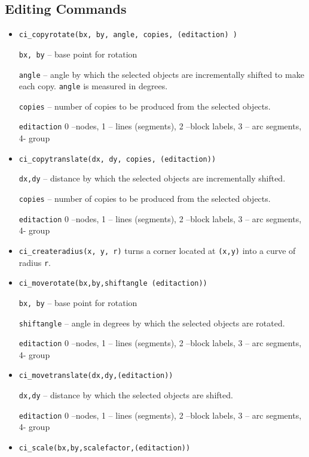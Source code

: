 \subsection{Editing Commands}
\begin{itemize}

\item \texttt{ci\_copyrotate(bx, by, angle, copies, (editaction) )}

\texttt{bx, by} -- base point for rotation

\texttt{angle} -- angle by which the selected objects are incrementally
shifted to make each copy. \texttt{angle} is measured in degrees.

\texttt{copies} -- number of copies to be produced from the selected
objects.

\texttt{editaction} 0 --nodes, 1 -- lines (segments), 2 --block labels, 3 --
arc segments, 4- group

\item \texttt{ci\_copytranslate(dx, dy, copies, (editaction))}

\texttt{dx,dy} -- distance by which the selected objects are incrementally
shifted.

\texttt{copies} -- number of copies to be produced from the selected
objects.

\texttt{editaction} 0 --nodes, 1 -- lines (segments), 2 --block labels, 3 --
arc segments, 4- group

\item{\tt ci\_createradius(x, y, r)} turns a corner located at {\tt (x,y)} into a curve of radius {\tt r}.

\item \texttt{ci\_moverotate(bx,by,shiftangle (editaction))}

\texttt{bx, by} -- base point for rotation

\texttt{shiftangle} -- angle in degrees by which the selected objects are
rotated.

\texttt{editaction} 0 --nodes, 1 -- lines (segments), 2 --block labels, 3 --
arc segments, 4- group

\item \texttt{ci\_movetranslate(dx,dy,(editaction))}

\texttt{dx,dy} -- distance by which the selected objects are shifted.

\texttt{editaction} 0 --nodes, 1 -- lines (segments), 2 --block labels, 3 --
arc segments, 4- group

\item \texttt{ci\_scale(bx,by,scalefactor,(editaction))}


\end{itemize}
